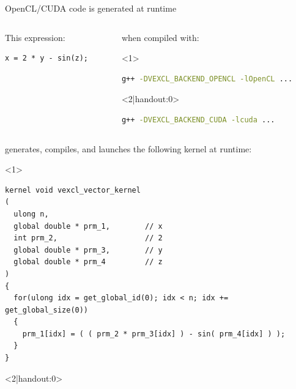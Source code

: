 \documentclass[@BEAMER_OPTIONS@]{beamer}
\begin{document}
\begin{frame}[fragile]{OpenCL/CUDA code is generated at runtime}
    \begin{columns}
        \begin{column}{0.38\textwidth}
            \begin{exampleblock}{This expression:}
                \begin{lstlisting}
x = 2 * y - sin(z);
                \end{lstlisting}
            \end{exampleblock}
        \end{column}
        \begin{column}{0.55\textwidth}
            \begin{exampleblock}{when compiled with:}
                \begin{onlyenv}<1>
                    \begin{lstlisting}[language=bash,numbers=none]
g++ -DVEXCL_BACKEND_OPENCL -lOpenCL ...
                    \end{lstlisting}
                \end{onlyenv}
                \begin{onlyenv}<2|handout:0>
                    \begin{lstlisting}[language=bash,numbers=none]
g++ -DVEXCL_BACKEND_CUDA -lcuda ...
                    \end{lstlisting}
                \end{onlyenv}
            \end{exampleblock}
        \end{column}
    \end{columns}
    \begin{exampleblock}{generates, compiles, and launches the following kernel
        at runtime:}
        \begin{onlyenv}<1>
            \begin{lstlisting}
kernel void vexcl_vector_kernel
(
  ulong n,
  global double * prm_1,        // x
  int prm_2,                    // 2
  global double * prm_3,        // y
  global double * prm_4         // z
)
{
  for(ulong idx = get_global_id(0); idx < n; idx += get_global_size(0))
  {
    prm_1[idx] = ( ( prm_2 * prm_3[idx] ) - sin( prm_4[idx] ) );
  }
}
            \end{lstlisting}
        \end{onlyenv}
        \begin{onlyenv}<2|handout:0>

\end{onlyenv}
\end{exampleblock}
\end{frame}
\end{document}

